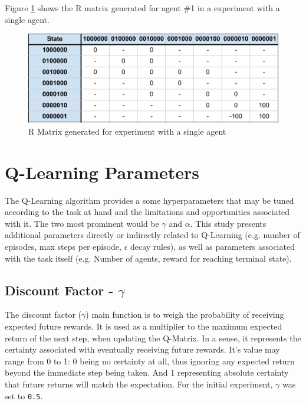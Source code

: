 \documentclass[10pt]{article}
\begin{document}
    Figure \ref{fig:r_matrix} shows the R matrix generated for agent \#1 in a experiment with a single agent.

    \begin{figure}[h]
        \centering
        \includegraphics[height=4cm]{./Images/5_R_Matrix.png}
        \caption{R Matrix generated for experiment with a single agent}
        \label{fig:r_matrix}
    \end{figure}

\section{Q-Learning Parameters}\label{sec:params}
    The Q-Learning algorithm provides a some hyperparameters that may be tuned according to the task at hand and the limitations and opportunities associated with it. The two most prominent would be $\gamma$ and $\alpha$. This study presents additional parameters directly or indirectly related to Q-Learning (e.g. number of episodes, max steps per episode, $\epsilon$ decay rules), as well as parameters associated with the task itself (e.g. Number of agents, reward for reaching terminal state).

    \subsection{Discount Factor - $\gamma$}
        The discount factor ($\gamma$) main function is to weigh the probability of receiving expected future rewards. It is used as a multiplier to the maximum expected return of the next step, when updating the Q-Matrix. In a sense, it represents the certainty associated with eventually receiving future rewards. It's value may range from 0 to 1: 0 being no certainty at all, thus ignoring any expected return beyond the immediate step being taken. And 1 representing absolute certainty that future returns will match the expectation. For the initial experiment, $\gamma$ was set to \texttt{0.5}.
\end{document}
